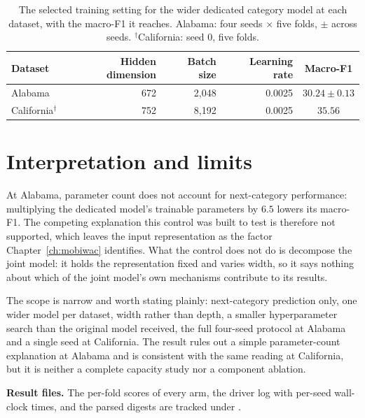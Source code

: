 \begin{table}[H]
    \centering
    \caption{The selected training setting for the wider dedicated category model at each dataset,
    with the macro-F1 it reaches. Alabama: four seeds $\times$ five folds, $\pm$ across seeds.
    $^{\dagger}$California: seed 0, five folds.}
    \label{tab:apx-parameter-arms}
    \begin{tabular}{lrrrc}
        \toprule
        Dataset & Hidden dimension & Batch size & Learning rate & Macro-F1 \\
        \midrule
        Alabama                 & 672 & 2,048 & 0.0025 & $30.24 \pm 0.13$ \\
        California$^{\dagger}$  & 752 & 8,192 & 0.0025 & $35.56$ \\
        \bottomrule
    \end{tabular}
\end{table}

\section{Interpretation and limits}
\label{sec:apx-parameter-result}

At Alabama, parameter count does not account for next-category performance: multiplying the
dedicated model's trainable parameters by $6.5$ lowers its macro-F1. The competing explanation this
control was built to test is therefore not supported, which leaves the input representation as the
factor Chapter~\ref{ch:mobiwac} identifies. What the control does not do is decompose the joint
model: it holds the representation fixed and varies width, so it says nothing about which of the
joint model's own mechanisms contribute to its results.

The scope is narrow and worth stating plainly: next-category prediction only, one wider model per
dataset, width rather than depth, a smaller hyperparameter search than the original model received,
the full four-seed protocol at Alabama and a single seed at California. The result rules out a
simple parameter-count explanation at Alabama and is consistent with the same reading at
California, but it is neither a complete capacity study nor a component ablation.

\noindent\textbf{Result files.} The per-fold scores of every arm, the driver log with per-seed
wall-clock times, and the parsed digests are tracked under
.
